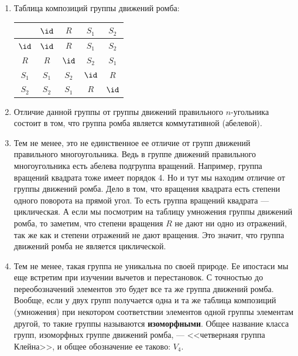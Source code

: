\begin{enumerate}
\item Таблица композиций группы движений ромба:
\begin{center}
\begin{tabular}{c||c|c|c|c|}
      & $\id$     & $R$   & $S_1$ & $S_2$ \\ \hline\hline
$\id$ & $\id$     & $R$   & $S_1$ & $S_2$ \\ \hline
$R$   & $R$       & $\id$ & $S_2$ & $S_1$ \\ \hline
$S_1$ & $S_1$     & $S_2$ & $\id$ & $R$ \\ \hline
$S_2$ & $S_2$     & $S_1$ & $R$   & $\id$ \\ \hline
\end{tabular}
\end{center}
\item Отличие данной группы от группы движений правильного $n$-угольника состоит в том, что группа ромба является коммутативной (абелевой).
\item Тем не менее, это не единственное ее отличие от групп движений правильного многоугольника.
Ведь в группе движений правильного многоугольника есть абелева подгруппа вращений. Например, группа вращений квадрата тоже имеет порядок 4. Но и тут мы находим отличие от группы движений ромба. Дело в том, что вращения квадрата есть степени одного поворота на прямой угол. То есть группа вращений квадрата --- циклическая. А если мы посмотрим на таблицу умножения группы движений ромба, то заметим, что степени вращения $R$ не дают ни одно из отражений, так же как и степени отражений не дают вращения. Это значит, что группа движений ромба не является циклической.
\item Тем не менее, такая группа не уникальна по своей природе. Ее ипостаси мы еще встретим при изучении вычетов и перестановок. С точностью до переобозначений элементов это будет все та же группа движений ромба. Вообще, если у двух групп получается одна и та же таблица композиций (умножения) при некотором соответствии элементов одной группы элементам другой, то такие группы называются \textbf{изоморфными}. Общее название класса групп, изоморфных группе движений ромба, --- <<четвернаяя группа Клейна>>, и общее обозначение ее таково: $V_4$.
\end{enumerate}

\label{LinearEqs}

